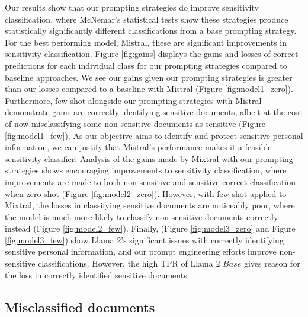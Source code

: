 Our results show that our prompting strategies do improve sensitivity classification, where McNemar’s statistical tests show these strategies produce statistically significantly different classifications from a base prompting strategy. For the best performing model, Mistral, these are significant improvements in sensitivity classification. Figure \ref{fig:gains} displays the gains and losses of correct predictions for each individual class for our prompting strategies compared to baseline approaches. We see our gains given our prompting strategies is greater than our losses compared to a baseline with Mistral (Figure \ref{fig:model1_zero}). Furthermore, few-shot alongside our prompting strategies with Mistral demonstrate gains are correctly identifying sensitive documents, albeit at the cost of now misclassifying some non-sensitive documents as sensitive (Figure \ref{fig:model1_few}). As our objective aims to identify and protect sensitive personal information, we can justify that Mistral’s performance makes it a feasible sensitivity classifier. Analysis of the gains made by Mixtral with our prompting strategies shows encouraging improvements to sensitivity classification, where improvements are made to both non-sensitive and sensitive correct classification when zero-shot (Figure \ref{fig:model2_zero}). However, with few-shot applied to Mixtral, the losses in classifying sensitive documents are noticeably poor, where the model is much more likely to classify non-sensitive documents correctly instead (Figure \ref{fig:model2_few}). Finally, (Figure \ref{fig:model3_zero} and Figure \ref{fig:model3_few}) show Llama 2’s significant issues with correctly identifying sensitive personal information, and our prompt engineering efforts improve non-sensitive classifications. However, the high TPR of Llama 2 $Base$ gives reason for the loss in correctly identified sensitive documents.

\subsection{Misclassified documents} 

